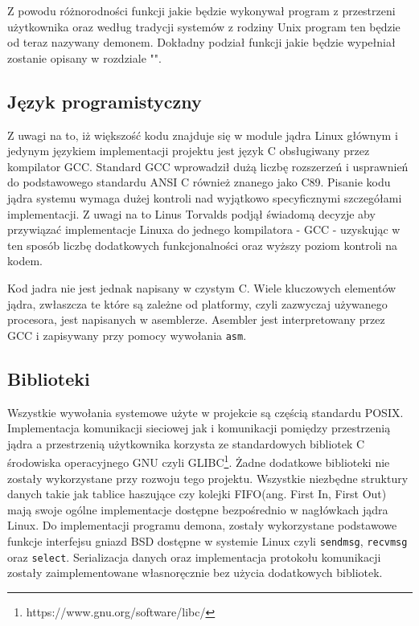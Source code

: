 \documentclass[10pt]{scrartcl}
\begin{document}
Z powodu różnorodności funkcji jakie będzie wykonywał program z przestrzeni użytkownika oraz według tradycji systemów z rodziny Unix program ten będzie od teraz nazywany demonem. Dokładny podział funkcji jakie będzie wypełniał zostanie opisany w rozdziale "".

\subsection{Język programistyczny}
\label{language}

Z uwagi na to, iż większość kodu znajduje się w module jądra Linux głównym i jedynym językiem implementacji projektu jest język C obsługiwany przez kompilator GCC\@. Standard GCC wprowadził dużą liczbę rozszerzeń i usprawnień do podstawowego standardu ANSI C również znanego jako C89. Pisanie kodu jądra systemu wymaga dużej kontroli nad wyjątkowo specyficznymi szczegółami implementacji. Z uwagi na to Linus Torvalds podjął świadomą decyzje aby przywiązać implementacje Linuxa do jednego kompilatora - GCC - uzyskując w ten sposób liczbę dodatkowych funkcjonalności\cite{gccextensions} oraz wyższy poziom kontroli na kodem.

Kod jadra nie jest jednak napisany w czystym C. Wiele kluczowych elementów jądra, zwłaszcza te które są zależne od platformy, czyli zazwyczaj używanego procesora, jest napisanych w asemblerze. Asembler jest interpretowany przez GCC i zapisywany przy pomocy wywołania \texttt{asm}\cite{asm}.

\subsection{Biblioteki}
\label{libraries}

Wszystkie wywołania systemowe użyte w projekcie są częścią standardu POSIX\@. Implementacja komunikacji sieciowej jak i komunikacji pomiędzy przestrzenią jądra a przestrzenią użytkownika korzysta ze standardowych bibliotek C środowiska operacyjnego GNU czyli GLIBC\footnote{https://www.gnu.org/software/libc/}. Żadne dodatkowe biblioteki nie zostały wykorzystane przy rozwoju tego projektu.  Wszystkie niezbędne struktury danych takie jak tablice haszujące czy kolejki FIFO(ang. First In, First Out) mają swoje ogólne implementacje dostępne bezpośrednio w nagłówkach jądra Linux. Do implementacji programu demona, zostały wykorzystane podstawowe funkcje interfejsu gniazd BSD dostępne w systemie Linux czyli \texttt{sendmsg}, \texttt{recvmsg} oraz \texttt{select}. Serializacja danych oraz implementacja protokołu komunikacji zostały zaimplementowane własnoręcznie bez użycia dodatkowych bibliotek.
\end{document}
